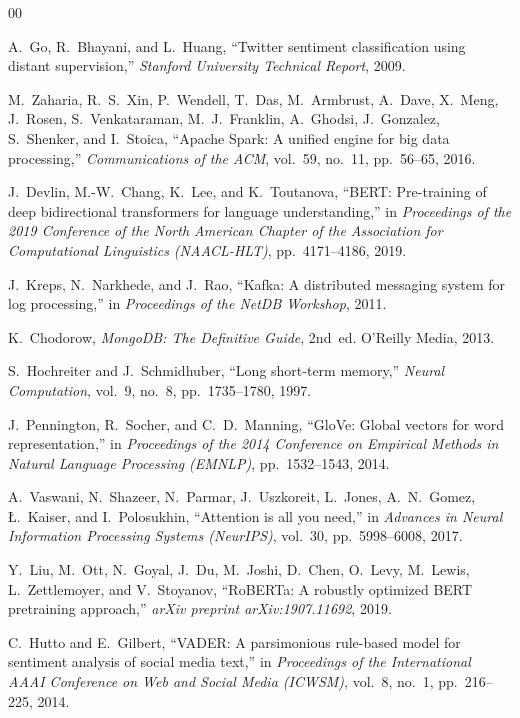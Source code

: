 \documentclass[conference]{IEEEtran}
\begin{document}

\begin{thebibliography}{00}

A.~Go, R.~Bhayani, and L.~Huang, ``Twitter sentiment classification using distant supervision,'' \textit{Stanford University Technical Report}, 2009.

M.~Zaharia, R.~S.~Xin, P.~Wendell, T.~Das, M.~Armbrust, A.~Dave, X.~Meng, J.~Rosen, S.~Venkataraman, M.~J.~Franklin, A.~Ghodsi, J.~Gonzalez, S.~Shenker, and I.~Stoica, ``Apache Spark: A unified engine for big data processing,'' \textit{Communications of the ACM}, vol.~59, no.~11, pp.~56--65, 2016.

J.~Devlin, M.-W.~Chang, K.~Lee, and K.~Toutanova, ``BERT: Pre-training of deep bidirectional transformers for language understanding,'' in \textit{Proceedings of the 2019 Conference of the North American Chapter of the Association for Computational Linguistics (NAACL-HLT)}, pp.~4171--4186, 2019.

J.~Kreps, N.~Narkhede, and J.~Rao, ``Kafka: A distributed messaging system for log processing,'' in \textit{Proceedings of the NetDB Workshop}, 2011.

K.~Chodorow, \textit{MongoDB: The Definitive Guide}, 2nd~ed.\hspace{1em} O'Reilly Media, 2013.

S.~Hochreiter and J.~Schmidhuber, ``Long short-term memory,'' \textit{Neural Computation}, vol.~9, no.~8, pp.~1735--1780, 1997.

J.~Pennington, R.~Socher, and C.~D.~Manning, ``GloVe: Global vectors for word representation,'' in \textit{Proceedings of the 2014 Conference on Empirical Methods in Natural Language Processing (EMNLP)}, pp.~1532--1543, 2014.

A.~Vaswani, N.~Shazeer, N.~Parmar, J.~Uszkoreit, L.~Jones, A.~N.~Gomez, {\L}.~Kaiser, and I.~Polosukhin, ``Attention is all you need,'' in \textit{Advances in Neural Information Processing Systems (NeurIPS)}, vol.~30, pp.~5998--6008, 2017.

Y.~Liu, M.~Ott, N.~Goyal, J.~Du, M.~Joshi, D.~Chen, O.~Levy, M.~Lewis, L.~Zettlemoyer, and V.~Stoyanov, ``RoBERTa: A robustly optimized BERT pretraining approach,'' \textit{arXiv preprint arXiv:1907.11692}, 2019.

C.~Hutto and E.~Gilbert, ``VADER: A parsimonious rule-based model for sentiment analysis of social media text,'' in \textit{Proceedings of the International AAAI Conference on Web and Social Media (ICWSM)}, vol.~8, no.~1, pp.~216--225, 2014.

\end{thebibliography}
\end{document}
